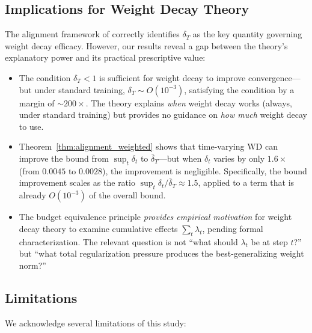 \documentclass{article}
\begin{document}
\subsection{Implications for Weight Decay Theory}

The alignment framework of \citet{xie2024investigating} correctly identifies
$\delta_T$ as the key quantity governing weight decay efficacy.
However, our results reveal a gap between the theory's explanatory power and its
practical prescriptive value:
\begin{itemize}
  \item The condition $\delta_T < 1$ is sufficient for weight decay to improve
        convergence---but under standard training, $\delta_T \sim O(10^{-3})$,
        satisfying the condition by a margin of $\sim 200\times$.
        The theory explains \emph{when} weight decay works (always, under standard
        training) but provides no guidance on \emph{how much} weight decay to use.
  \item Theorem~\ref{thm:alignment_weighted} shows that time-varying WD can improve
        the bound from $\sup_t \delta_t$ to $\bar{\delta}_T$---but when $\delta_t$
        varies by only $1.6\times$ (from $0.0045$ to $0.0028$), the improvement is
        negligible.
        Specifically, the bound improvement scales as the ratio
        $\sup_t \delta_t / \bar{\delta}_T \approx 1.5$, applied to a term that is
        already $O(10^{-3})$ of the overall bound.
  \item The budget equivalence principle \emph{provides empirical motivation} for
        weight decay theory to examine cumulative effects $\sum_t \lambda_t$, pending
        formal characterization.
        The relevant question is not ``what should $\lambda_t$ be at step $t$?''
        but ``what total regularization pressure produces the best-generalizing
        weight norm?''
\end{itemize}

\subsection{Limitations}
\label{sec:limitations}

We acknowledge several limitations of this study:
\end{document}

